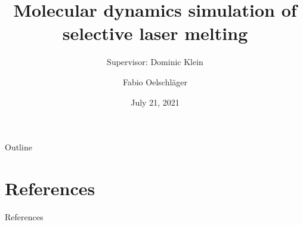 \documentclass[fleqn]{presentation}
\title[MD simulation of SLM]{Molecular dynamics simulation of selective laser melting}
\subtitle{
	Supervisor: Dominic Klein}
\author{Fabio Oelschläger}
\date{July 21, 2021}
\begin{document}
\begin{frame}
	\maketitle
\end{frame}


\begin{frame}{Outline}
	\tableofcontents
\end{frame}







\section*{References}
\begin{frame}{References}
	\nocite{horsch20143d}
	
\end{frame}
\end{document}
